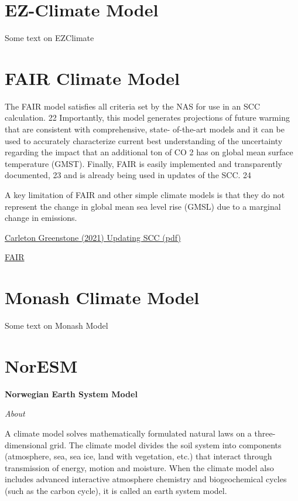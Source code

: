 \documentclass[
]{book}
\begin{document}
\hypertarget{ez-climate-model}{%
\section{EZ-Climate Model}\label{ez-climate-model}}

Some text on EZClimate

\hypertarget{fair-climate-model}{%
\section{FAIR Climate Model}\label{fair-climate-model}}

The FAIR model satisfies all
criteria set by the NAS for use in an SCC calculation. 22 Importantly, this model
generates projections of future warming that are consistent with comprehensive, state-
of-the-art models and it can be used to accurately characterize current best
understanding of the uncertainty regarding the impact that an additional ton of CO 2
has on global mean surface temperature (GMST). Finally, FAIR is easily implemented
and transparently documented, 23 and is already being used in updates of the SCC. 24

A key limitation of FAIR and other simple climate models is that they do not represent
the change in global mean sea level rise (GMSL) due to a marginal change in emissions.

\href{Greenstone_2021_Updating_SCC.pdf}{Carleton Greenstone (2021) Updating SCC (pdf)}

\href{https://fair.readthedocs.io/en/latest/}{FAIR}

\hypertarget{monash-climate-model}{%
\section{Monash Climate Model}\label{monash-climate-model}}

Some text on Monash Model

\hypertarget{noresm}{%
\section{NorESM}\label{noresm}}

\textbf{Norwegian Earth System Model}

\emph{About}

A climate model solves mathematically formulated natural laws on a three-dimensional grid. The climate model divides the soil system into components (atmosphere, sea, sea ice, land with vegetation, etc.) that interact through transmission of energy, motion and moisture. When the climate model also includes advanced interactive atmosphere chemistry and biogeochemical cycles (such as the carbon cycle), it is called an earth system model.
\end{document}
